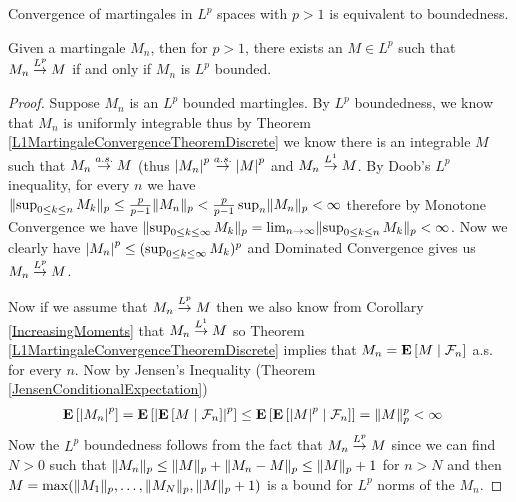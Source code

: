 Convergence of martingales in $L^p$ spaces with $p > 1$ is equivalent
to boundedness.
\begin{thm}\label{LpMartingaleConvergenceDiscrete}Given a
  martingale $M_n$, then for $p > 1$, there exists an $M \in L^p$ such that $M_n
  \tolp{p} M$ if and only if $M_n$ is $L^p$ bounded.
\end{thm}
\begin{proof}
Suppose $M_n$ is an $L^p$ bounded martingles.  By $L^p$ boundedness,
we know that $M_n$ is uniformly integrable thus by Theorem
\ref{L1MartingaleConvergenceTheoremDiscrete}
we know there is an integrable $M$ such that $M_n \toas M$ (thus $\abs{M_n}^p \toas \abs{M}^p$ and $M_n
\tolp{1} M$.  By Doob's $L^p$ inequality, for every $n$ we have
$\norm{\sup_{0 \leq k \leq n}M_k}_p \leq \frac{p}{p-1} \norm{M_n}_p <
\frac{p}{p-1} \sup_n \norm{M_n}_p < \infty$ therefore by Monotone
Convergence we have $\norm{\sup_{0 \leq k \leq \infty}M_k}_p = \lim_{n
  \to \infty}\norm{\sup_{0 \leq k \leq n}M_k}_p < \infty$.  Now we
clearly have $\abs{M_n}^p \leq (\sup_{0 \leq k \leq \infty}M_k)^p$ and
Dominated Convergence gives us $M_n \tolp{p} M$.

Now if we assume that $M_n \tolp{p} M$ then we also know from
Corollary \ref{IncreasingMoments} that $M_n
\tolp{1} M$ so Theorem \ref{L1MartingaleConvergenceTheoremDiscrete}
implies that $M_n = \cexpectationlong{\mathcal{F}_n}{M}$ a.s. for
every $n$.  Now by Jensen's Inequality (Theorem \ref{JensenConditionalExpectation})
\begin{align*}
\expectation{\abs{M_n}^p} &=
\expectation{\abs{\cexpectationlong{\mathcal{F}_n}{M}}^p} \leq 
\expectation{\cexpectationlong{\mathcal{F}_n}{\abs{M}^p}} =
\norm{M}_p^p < \infty
\end{align*}
Now the $L^p$ boundedness follows from the fact that $M_n \tolp{p} M$
since we can find $N>0$ such that $\norm{M_n}_p \leq \norm{M}_p +
\norm{M_n-M}_p \leq \norm{M}_p + 1$ for $n > N$ and then $M =
\max(\norm{M_1}_p, \dotsc, \norm{M_N}_p,  \norm{M}_p + 1)$ is a bound
for $L^p$ norms of the $M_n$.
\end{proof}

